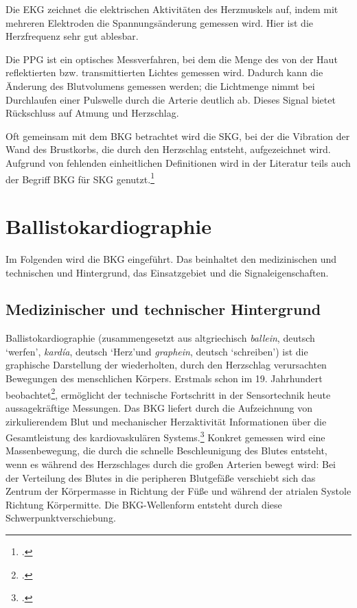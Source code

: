 	Die \acf{EKG} zeichnet die elektrischen Aktivitäten des Herzmuskels auf, indem mit mehreren Elektroden die Spannungsänderung gemessen wird. Hier ist die Herzfrequenz sehr gut ablesbar.
	
	Die \acf{PPG} ist ein optisches Messverfahren, bei dem die Menge des von der Haut reflektierten bzw. transmittierten Lichtes gemessen wird. Dadurch kann die Änderung des Blutvolumens gemessen werden; die Lichtmenge nimmt bei Durchlaufen einer Pulswelle durch die Arterie deutlich ab. Dieses Signal bietet Rückschluss auf Atmung und Herzschlag. %
	
	Oft gemeinsam mit dem \ac{BKG} betrachtet wird die \acf{SKG}, bei der die Vibration der Wand des Brustkorbs, die durch den Herzschlag entsteht, aufgezeichnet wird. Aufgrund von fehlenden einheitlichen Definitionen wird in der Literatur teils auch der Begriff \ac{BKG} für \ac{SKG} genutzt.\footcite[Vgl.][]{Inan2015}

	\section{Ballistokardiographie}\label{ballistokardiographie}
	
	Im Folgenden wird die \acl{BKG} eingeführt. Das beinhaltet den medizinischen und technischen und Hintergrund, das Einsatzgebiet und die Signaleigenschaften.
	
	\subsection{Medizinischer und technischer Hintergrund}
	
	Ballistokardiographie (zusammengesetzt aus altgriechisch \textit{ballein}, deutsch \textquoteleft werfen\textquoteright, \textit{kardía}, deutsch \textquoteleft Herz\textquoteright und \textit{graphein}, deutsch \textquoteleft schreiben\textquoteright) ist die graphische Darstellung der wiederholten, durch den Herzschlag verursachten Bewegungen des menschlichen Körpers. Erstmals schon im 19. Jahrhundert beobachtet\footcite[Vgl.][]{Gordon1877}, ermöglicht der technische Fortschritt in der Sensortechnik heute aussagekräftige Messungen. Das \ac{BKG} liefert durch die Aufzeichnung von zirkulierendem Blut und mechanischer Herzaktivität Informationen über die Gesamtleistung des kardiovaskulären Systems.\footcite[Vgl.][]{Pinheiro2010} Konkret gemessen wird eine Massenbewegung, die durch die schnelle Beschleunigung des Blutes entsteht, wenn es während des Herzschlages durch die großen Arterien bewegt wird: Bei der Verteilung des Blutes in die peripheren Blutgefäße verschiebt sich das Zentrum der Körpermasse in Richtung der Füße und während der atrialen Systole Richtung Körpermitte. Die \ac{BKG}-Wellenform entsteht durch diese Schwerpunktverschiebung.
	
